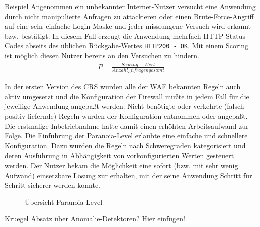 \textcolor{bhtGray}{ Beispiel} Angenommen ein unbekannter Internet-Nutzer versucht eine Anwendung durch nicht manipulierte Anfragen zu attackieren oder einen Brute-Force-Angriff auf eine sehr einfache Login-Maske und jeder misslungene Versuch wird erkannt bzw. bestätigt. In diesem Fall erzeugt die Anwendung mehrfach HTTP-Status-Codes abseits des üblichen Rückgabe-Wertes \verb=HTTP200 - OK=. Mit einem Scoring ist möglich diesen Nutzer bereits an den Versuchen zu hindern.
\begin{align}
  P = \frac{Scoring-Wert}{Anzahl_Anfragen gesamt}
\end{align}

In der ersten Version des CRS wurden alle der WAF bekannten Regeln auch aktiv umgesetzt und die Konfiguration der Firewall mußte in jedem Fall für die jeweilige Anwendung angepaßt werden. Nicht benötigte oder verkehrte (falsch-positiv liefernde) Regeln wurden der Konfiguration entnommen oder angepaßt. Die erstmalige Inbetriebnahme hatte damit einen erhöhten Arbeitsaufwand zur Folge. Die Einführung der Paranoia-Level erlaubte eine einfache und schnellere Konfiguration. Dazu wurden die Regeln nach Schweregraden kategorisiert und deren Ausführung in Abhängigkeit von vorkonfigurierten Werten gesteuert werden. Der Nutzer bekam die Möglichkeit eine sofort (bzw. mit sehr wenig Aufwand) einsetzbare Lösung zur erhalten, mit der seine Anwendung Schritt für Schritt sicherer werden konnte.

\begin{figure}[ht]
  \centering
  
  \caption{Übersicht Paranoia Level \cite{owaspcrs}}
  \label{fig.paranoia}
\end{figure}



\begin{neu}
  Kruegel Absatz über Anomalie-Detektoren? Hier einfügen!
\end{neu}

